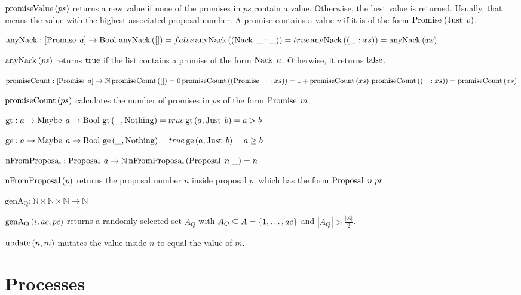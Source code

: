 $\operatorname{promiseValue}\left(ps\right)$ returns a new value if none of the promises in $ps$ contain a value. Otherwise, the best value is returned. Usually, that means the value with the highest associated proposal number.
A promise contains a value $v$ if it is of the form $\operatorname{Promise}\; (\operatorname{Just}\; v)$.

$\operatorname{anyNack} : [\operatorname{Promise}\; a] \to \operatorname{Bool}\\
\operatorname{anyNack}\left([]\right) = false\\
\operatorname{anyNack}\left(\left(\operatorname{Nack}\; \_: \_\right)\right) = true\\
\operatorname{anyNack}\left(\left(\_:xs\right)\right) = \operatorname{anyNack}\left(xs\right)$

$\operatorname{anyNack}\left(ps\right)$ returns $\operatorname{true}$ if the list contains a promise of the form $\operatorname{Nack}\; n$. Otherwise, it returns $\operatorname{false}$.

$\operatorname{promiseCount} : [\operatorname{Promise}\; a] \to \mathbb{N}\\
\operatorname{promiseCount}\left([]\right) = 0\\
\operatorname{promiseCount}\left(\left(\operatorname{Promise}\; \_:xs\right)\right) = 1 + \operatorname{promiseCount}\left(xs\right)\\
\operatorname{promiseCount}\left(\left(\_:xs\right)\right) = \operatorname{promiseCount}\left(xs\right)$

$\operatorname{promiseCount}\left(ps\right)$ calculates the number of promises in $ps$ of the form $\operatorname{Promise}\; m$.

$\operatorname{gt}: a \to \operatorname{Maybe}\; a \to \operatorname{Bool}\\
\operatorname{gt}\left(\_, \operatorname{Nothing}\right) = true\\
\operatorname{gt}\left(a, \operatorname{Just}\; b\right) = a > b$

$\operatorname{ge}: a \to \operatorname{Maybe}\; a \to \operatorname{Bool}\\
\operatorname{ge}\left(\_, \operatorname{Nothing}\right) = true\\
\operatorname{ge}\left(a, \operatorname{Just}\; b\right) = a \ge b$

$\operatorname{nFromProposal} : \operatorname{Proposal}\; a \to \mathbb{N}\\
\operatorname{nFromProposal}\left(\operatorname{Proposal}\; n\; \_ \right) = n$

$\operatorname{nFromProposal}\left(p \right)$ returns the proposal number $n$ inside proposal $p$, which has the form $\operatorname{Proposal}\; n\; pr$.

$\operatorname{genA_Q} : \mathbb{N} \times \mathbb{N} \times \mathbb{N} \to \mathbb{N}$

$\operatorname{genA_Q}\left(i, ac, pc\right)$ returns a randomly selected set $A_Q$ with $A_Q \subseteq A = \left\{1, \dots, ac\right\}$ and $|A_Q| > \frac{|A|}{2}$.

$\operatorname{update} \left(n, m\right)$ mutates the value inside $n$ to equal the value of $m$.

\section{Processes}
\newcommand{\Sys}[2]{\operatorname{Sys}\left(#1, #2\right)}
\newcommand{\Pa}[0]{\operatorname{P^a}}
\newcommand{\Pp}[0]{\operatorname{P^p}}
\newcommand{\PaCont}[0]{\operatorname{P^a_{cont}}}

